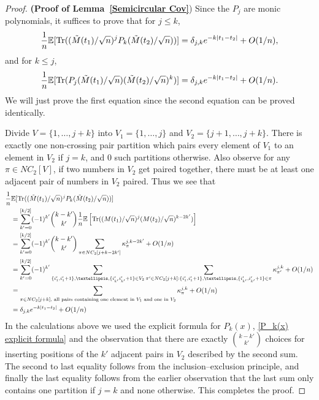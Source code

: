 \documentclass{amsart}
\numberwithin{equation}{section}
\newcommand{\E}{\mathbb{E}}
\begin{document}
\begin{proof}\textbf{(Proof of Lemma~\ref{Semicircular Cov}})
Since the $P_j$ are monic polynomials, it suffices to prove that for $j\leq k$, 
\begin{equation*}
    \frac{1}{n}\E[\mathrm{Tr}((\Tilde{M}(t_1)/\sqrt{n})^j P_k(\Tilde{M}(t_2)/\sqrt{n}))]=\delta_{j,k} e^{-k|t_1-t_2|}+O(1/n),
\end{equation*}
and for $k\leq j$, 
\begin{equation*}
\frac{1}{n}\E[\mathrm{Tr}(P_j(\Tilde{M}(t_1)/\sqrt{n}) (\Tilde{M}(t_2)/\sqrt{n})^k)]=\delta_{j,k} e^{-k|t_1-t_2|}+O(1/n).    
\end{equation*}
We will just prove the first equation since the second equation can be proved identically. 

Divide $V=\{1,\dots,j+k\}$ into $V_1=\{1,\dots,j\}$ and $V_2=\{j+1,\dots,j+k\}$. There is exactly one non-crossing pair partition which pairs every element of $V_1$ to an element in $V_2$ if $j=k$, and $0$ such partitions otherwise. Also observe for any $\pi \in NC_2[V]$, if two numbers in $V_2$ get paired together, there must be at least one adjacent pair of numbers in $V_2$ paired. Thus we see that
\begin{equation*}
    \begin{split}
        \frac{1}{n}&\E[\mathrm{Tr}((\Tilde{M}(t_1)/\sqrt{n})^j P_k(\Tilde{M}(t_2)/\sqrt{n}))]\\
        &= \sum_{k'=0}^{[k/2]}(-1)^{k'} \binom{k-k'}{k'} \frac{1}{n}\E\left[\mathrm{Tr}((M(t_1)/\sqrt{n})^j (M(t_2)/\sqrt{n})^{k-2k'})\right]\\
        &=\sum_{k'=0}^{[k/2]}(-1)^{k'} \binom{k-k'}{k'} \sum_{\pi \in NC_2[j+k-2k']} \kappa^{j,k-2k'}_{\pi}+O(1/n)\\
        &= \sum_{k'=0}^{[k/2]}(-1)^{k'} \sum_{{\{i'_1,i'_1+1\},\dots,\{i'_{k'} i'_{k'}+1\} \in V_2}} \sum_{\pi' \in NC_2[j+k]: \{i'_1,i'_1+1\},\dots,\{i'_{k'},i'_{k'}+1\} \in \pi} \kappa_{\pi'}^{j,k}+O(1/n)\\
        &= \sum_{\pi \in NC_2[j+k], \text{ all pairs containing one element in } V_1 \text{ and one in } V_2} \kappa_{\pi}^{j,k}+O(1/n)\\
        &=\delta_{j,k} e^{-k|t_1-t_2|}+O(1/n)
    \end{split}
\end{equation*}
In the calculations above we used the explicit formula for $P_k(x)$, \eqref{P_k(x) explicit formula} and the observation that there are exactly $\binom{k-k'}{k'}$ choices for inserting positions of the $k'$ adjacent pairs in $V_2$ described by the second sum. The second to last equality follows from the inclusion--exclusion principle, and finally the last equality follows from the earlier observation that the last sum only contains one partition if $j=k$ and none otherwise. This completes the proof.    
\end{proof}
\end{document}
